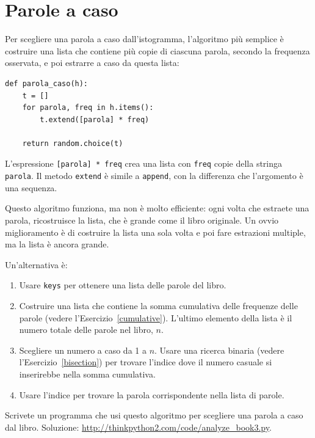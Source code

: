\documentclass[10pt]{book}
\begin{document}
\section{Parole a caso}
\label{randomwords}

Per scegliere una parola a caso dall'istogramma, l'algoritmo più semplice è  costruire una lista che contiene più copie di ciascuna parola, secondo la frequenza osservata, e poi estrarre a caso da questa lista:

\begin{verbatim}
def parola_caso(h):
    t = []
    for parola, freq in h.items():
        t.extend([parola] * freq)

    return random.choice(t)
\end{verbatim}
%
L'espressione {\tt [parola] * freq} crea una lista con {\tt freq}
copie della stringa {\tt parola}.  Il metodo {\tt extend}
è simile a {\tt append}, con la differenza che l'argomento è una sequenza.

Questo algoritmo funziona, ma non è molto efficiente: ogni volta che estraete una parola, ricostruisce la lista, che è grande come il libro originale. Un ovvio miglioramento è di costruire la lista una sola volta e poi fare estrazioni multiple, ma la lista è ancora grande.

Un'alternativa è:

\begin{enumerate}

\item Usare {\tt keys} per ottenere una lista delle parole del libro.

\item Costruire una lista che contiene la somma cumulativa delle frequenze delle parole (vedere l'Esercizio~\ref{cumulative}).  L'ultimo elemento della lista è il numero totale delle parole nel libro, $n$.
  
\item Scegliere un numero a caso da 1 a $n$.  Usare una ricerca binaria
  (vedere l'Esercizio~\ref{bisection}) per trovare l'indice dove il numero casuale si inserirebbe nella somma cumulativa.

\item Usare l'indice per trovare la parola corrispondente nella lista di parole.

\end{enumerate}

\vspace{0.2in}
\begin{exercise}
\label{randhist}

Scrivete un programma che usi questo algoritmo per scegliere una parola a caso dal libro. Soluzione: \url{http://thinkpython2.com/code/analyze_book3.py}.

\end{exercise}
\end{document}
